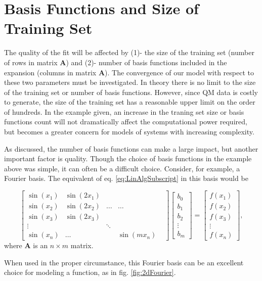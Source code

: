 \section{Basis Functions and Size of Training Set}\label{Sect:samplesAndFunctions}
\par The quality of the fit will be affected by (1)- the size of the training set (number of rows in matrix $\mathbf{A}$) and (2)- number of basis functions included in the expansion (columns in matrix $\mathbf{A}$). The convergence of our model with respect to these two parameters must be investigated. In theory there is no limit to the size of the training set or number of basis functions. However, since QM data is costly to generate, the size of the training set has a reasonable upper limit on the order of hundreds. In the example given, an increase in the traning set size or basis functions count will not dramatically affect the computational power required, but becomes a greater concern for models of systems with increasing complexity. 
\par As discussed, the number of basis functions can make a large impact, but another important factor is quality. Though the choice of basis functions in the example above was simple, it can often be a difficult choice. Consider, for example, a Fourier basis. The equivalent of eq. \ref{eq:LinAlgSubscript} in this basis would be

\begin{equation} \label{eq:fourierBasis}
\begin{bmatrix}
\sin(x_1) & \sin(2x_1) \\
\sin(x_2) & \sin(2x_2) & \ldots & \ldots \\
\sin(x_3) & \sin(2x_3) \\
\vdots & & \ddots & & \\
\sin(x_n) & \ldots & & \sin(mx_n)
\end{bmatrix}
\begin{bmatrix}
b_0 \\
b_1 \\
b_2 \\
\vdots \\
b_m 
\end{bmatrix}
=
\begin{bmatrix}
f(x_1) \\ 
f(x_2) \\
f(x_3) \\ 
\vdots \\
f(x_n)
\end{bmatrix},
\end{equation}
where $\mathbf{A}$ is an $n\times m$ matrix.
\par When used in the proper circumstance, this Fourier basis can be an excellent choice for modeling a function, as in fig. \ref{fig:2dFourier}.

